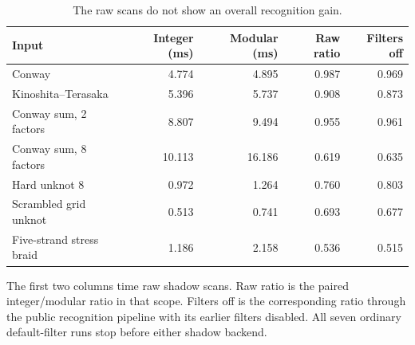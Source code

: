 \begin{table}[htbp]
\centering\small
\caption{The raw scans do not show an overall recognition gain.}
\label{tab:recognition}
\begin{tabular}{@{}lrrrr@{}}
\toprule
Input & Integer (ms) & Modular (ms) & Raw ratio & Filters off\\
\midrule
Conway & 4.774 & 4.895 & 0.987 & 0.969\\
Kinoshita--Terasaka & 5.396 & 5.737 & 0.908 & 0.873\\
Conway sum, 2 factors & 8.807 & 9.494 & 0.955 & 0.961\\
Conway sum, 8 factors & 10.113 & 16.186 & 0.619 & 0.635\\
Hard unknot 8 & 0.972 & 1.264 & 0.760 & 0.803\\
Scrambled grid unknot & 0.513 & 0.741 & 0.693 & 0.677\\
Five-strand stress braid & 1.186 & 2.158 & 0.536 & 0.515\\
\bottomrule
\end{tabular}
\par\smallskip\begin{minipage}{0.97\textwidth}\footnotesize
The first two columns time raw shadow scans. Raw ratio is the paired integer/modular ratio in that scope. Filters off is the corresponding ratio through the public recognition pipeline with its earlier filters disabled. All seven ordinary default-filter runs stop before either shadow backend.
\end{minipage}
\end{table}
